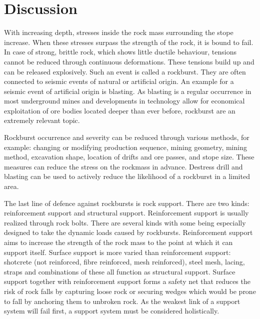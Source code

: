 \chapter{Discussion}
\label{ch:con}


With increasing depth, stresses inside the rock mass surrounding the stope increase. When these stresses surpass the strength of the rock, it is bound to fail. In case of strong, brittle rock, which shows little ductile behaviour, tensions cannot be reduced through continuous deformations. These tensions build up and can be released explosively. %
Such an event is called a rockburst. They are often connected to seismic events of natural or artificial origin. An example for a seismic event of artificial origin is blasting. As blasting is a regular occurrence in most underground mines and developments in technology allow for economical exploitation of ore bodies located deeper than ever before, rockburst are an extremely relevant topic.

Rockburst occurrence and severity can be reduced through various methods, for example: changing or modifying production sequence, mining geometry, mining method, excavation shape, location of drifts and ore passes, and stope size. These measures can reduce the stress on the rockmass in advance. Destress drill and blasting can be used to actively reduce the likelihood of a rockburst in a limited area. \autocite[219]{Kaiser12}

The last line of defence against rockbursts is rock support. There are two kinds: reinforcement support and structural support. 
Reinforcement support is usually realized through rock bolts. There are several kinds with some being especially designed to take the dynamic loads caused by rockbursts. Reinforcement support aims to increase the strength of the rock mass to the point at which it can support itself. 
Surface support is more varied than reinforcement support: shotcrete (not reinforced, fibre reinforced, mesh reinforced), steel mesh, lacing, straps and combinations of these all function as structural support. Surface support together with reinforcement support forms a safety net that reduces the risk of rock falls by capturing loose rock or securing wedges which would be prone to fall by anchoring them to unbroken rock. As the weakest link of a support system will fail first, a support system must be considered holistically.

